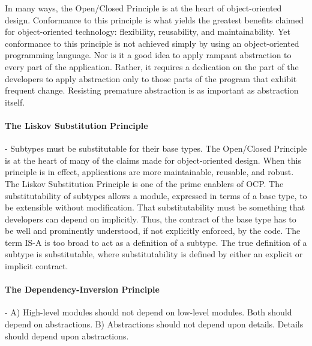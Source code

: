 \documentclass{llncs}
\begin{document}
In many ways, the Open/Closed Principle is at the heart of object-oriented design. 
Conformance to this principle is what yields the greatest benefits claimed for object-oriented technology: flexibility,
reusability, and maintainability.
Yet conformance to this principle is not achieved simply by using an object-oriented programming language.
Nor is it a good idea to apply rampant abstraction to every part of the application. 
Rather, it requires a dedication on the part of the developers to apply abstraction only to those parts of the program that exhibit frequent change. Resisting premature abstraction is as important as abstraction itself.

\paragraph{The Liskov Substitution Principle} - Subtypes must be substitutable for their base types.
The Open/Closed Principle is at the heart of many of the claims made for object-oriented design.
When this principle is in effect, applications are more maintainable, reusable, and robust. 
The Liskov Substitution Principle is one of the prime enablers of OCP.
The substitutability of subtypes allows a module, expressed in terms of a base type, to be extensible without modification. 
That substitutability must be something that developers can depend on implicitly.
Thus, the contract of the base type has to be well and prominently understood, if not explicitly enforced, by the code.
The term IS-A is too broad to act as a definition of a subtype. 
The true definition of a subtype is substitutable, where substitutability is defined by either an explicit or implicit contract.\cite{MartinASD}\cite{Dooley}


\paragraph{The Dependency-Inversion Principle} - A) High-level modules should not depend on low-level modules. 
Both should depend on abstractions. 
B) Abstractions should not depend upon details. 
Details should depend upon abstractions.
\end{document}
